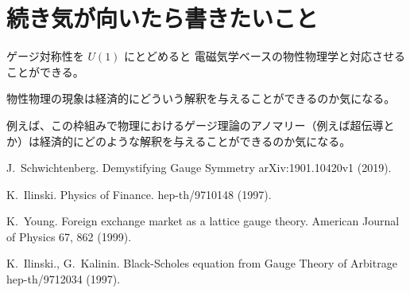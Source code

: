 \documentclass[uplatex]{jsarticle}
\begin{document}
\section{続き気が向いたら書きたいこと}

ゲージ対称性を $U(1)$ にとどめると
電磁気学ベースの物性物理学と対応させることができる。

物性物理の現象は経済的にどういう解釈を与えることができるのか気になる。

例えば、この枠組みで物理におけるゲージ理論のアノマリー（例えば超伝導とか）は経済的にどのような解釈を与えることができるのか気になる。



\begin{thebibliography}{9}

	J.~Schwichtenberg.
	\newblock Demystifying Gauge Symmetry
	\newblock arXiv:1901.10420v1 (2019).

	K.~Ilinski.
	\newblock Physics of Finance.
	\newblock hep-th/9710148 (1997).

	K.~Young.
	\newblock Foreign exchange market as a lattice gauge theory.
	\newblock American Journal of Physics 67, 862 (1999).

	K.~Ilinski., G.~Kalinin.
	\newblock Black-Scholes equation from Gauge Theory of Arbitrage
	\newblock hep-th/9712034 (1997).

\end{thebibliography}
\end{document}
